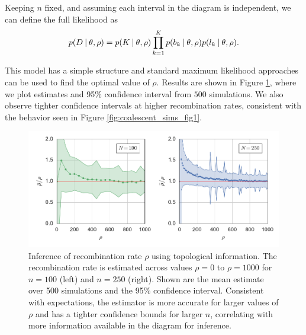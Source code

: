 Keeping $n$ fixed, and assuming each interval in the diagram is independent, we can define the full likelihood as
\begin{equation}
p(D \:\vert\: \theta,\rho) = p(K \:\vert\: \theta,\rho)\displaystyle\prod_{k=1}^{K}p(b_k \:\vert\: \theta,\rho)p(l_k  \:\vert\: \theta,\rho).
\end{equation}

This model has a simple structure and standard maximum likelihood approaches can be used to find the optimal value of $\rho$.
Results are shown in Figure \ref{fig:param_inference}, where we plot estimates and 95\% confidence interval from $500$ simulations.
We also observe tighter confidence intervals at higher recombination rates, consistent with the behavior seen in Figure \ref{fig:coalescent_sims_fig1}.

\begin{figure}
\centering
\includegraphics[]{fig/parametric_inference/coalescent_sims_fig5.pdf}
\caption[Inference of recombination rate $\rho$ using topological information]{Inference of recombination rate $\rho$ using topological information. The recombination rate is estimated across values $\rho=0$ to $\rho=1000$ for $n=100$ (left) and $n=250$ (right). Shown are the mean estimate over 500 simulations and the 95\% confidence interval. Consistent with expectations, the estimator is more accurate for larger values of $\rho$ and has a tighter confidence bounds for larger $n$, correlating with more information available in the diagram for inference.}
\label{fig:param_inference}
\end{figure}


